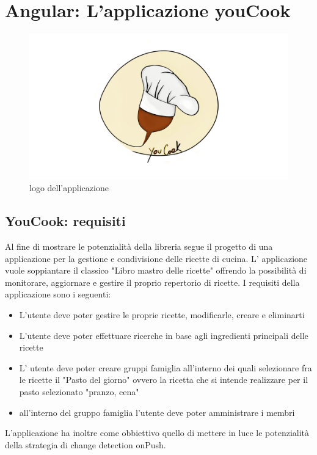 \chapter{Angular: L'applicazione youCook}
\begin{figure}[H]
    \centering
 \includegraphics[scale=0.2]{resources/youCook_logo.jpg}
   \caption{logo dell'applicazione}
\end{figure}
\newpage
\section{YouCook: requisiti}
Al fine di mostrare le potenzialità della libreria segue il progetto di una applicazione per la gestione e condivisione delle ricette di cucina.
L' applicazione vuole soppiantare il classico "Libro mastro delle ricette" offrendo la possibilità di monitorare, aggiornare e gestire il proprio repertorio di ricette.
I requisiti della applicazione sono i seguenti:
\begin{itemize}
    \item L'utente deve poter gestire le proprie ricette, modificarle, creare e eliminarti
    \item L'utente deve poter effettuare ricerche in base agli ingredienti principali delle ricette
    \item L' utente deve poter creare gruppi famiglia all'interno dei quali selezionare fra le ricette il "Pasto del giorno" ovvero la ricetta che si intende realizzare per il pasto selezionato "pranzo, cena"
    \item all'interno del gruppo famiglia l'utente deve poter amministrare i membri

\end{itemize}
L'applicazione ha inoltre come obbiettivo quello di mettere in luce le potenzialità della strategia di change detection onPush.
\newpage
